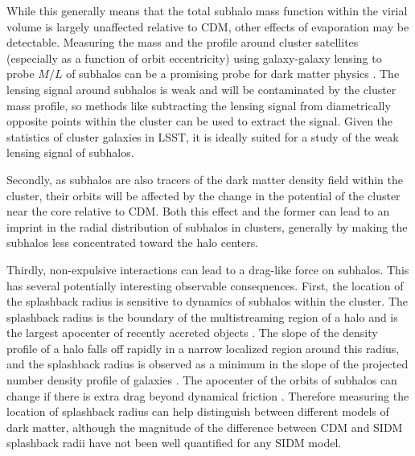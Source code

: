 While this generally means that the total subhalo mass function within the virial volume is largely unaffected relative to CDM, other effects of evaporation may be detectable. Measuring the mass and the profile around cluster satellites (especially as a function of orbit eccentricity) using galaxy-galaxy lensing to probe $M/L$ of subhalos can be a promising probe for dark matter physics \citep{Natarajan:2017sbo}. The lensing signal around subhalos is weak and will be contaminated by the cluster mass profile, so methods like subtracting the lensing signal from diametrically opposite points within the cluster can be used to  extract the signal. Given the statistics of cluster galaxies in LSST, it is ideally suited for a study of the weak lensing signal of subhalos.  

Secondly, as subhalos are also tracers of the dark matter density field within the cluster, their orbits will be affected by the change in the potential of the cluster near the core relative to CDM.  Both this effect and the former can lead to an imprint in the radial distribution of subhalos in clusters, generally by making the subhalos less concentrated toward the halo centers.

Thirdly, non-expulsive interactions can lead to a drag-like force on subhalos.  This has several potentially interesting observable consequences.  First, the location of the splashback radius is sensitive to dynamics of subhalos within the cluster. The splashback radius is the boundary of the multistreaming region of a halo and is the largest apocenter of recently accreted objects \cite{Diemer:2014xya,Adhikari:2014lna}. The slope of the density profile of a halo falls off rapidly in a narrow localized region around this radius, and the splashback radius is observed as a minimum in the slope of the projected number density profile of galaxies \cite{More:2016vgs,Baxter:2017csy,Chang:2017hjt}.
The apocenter of the orbits of subhalos can change if there is extra drag beyond dynamical friction \citep{Kummer2018}.  %
Therefore measuring the location of splashback radius can help distinguish between different models of dark matter, although the magnitude of the difference between CDM and SIDM splashback radii have not been well quantified for any SIDM model.

